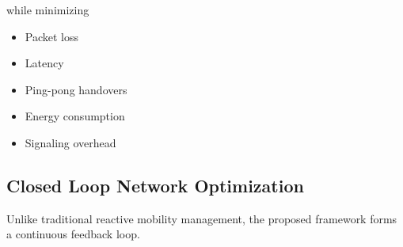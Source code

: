\documentclass[12pt,a4paper]{article}\usepackage[a4paper,margin=1in]{geometry}\usepackage{graphicx}\usepackage{longtable}\usepackage{booktabs}\usepackage{hyperref}\usepackage{enumitem}\usepackage{amsmath}\usepackage{tikz}\usepackage{pgfgantt}\usepackage{setspace}\setstretch{1.15}\usetikzlibrary{positioning,arrows.meta,shapes.geometric}
\begin{document}
	while minimizing
	
	\begin{itemize}
		
		\item Packet loss
		
		\item Latency
		
		\item Ping-pong handovers
		
		\item Energy consumption
		
		\item Signaling overhead
		
	\end{itemize}
	
	
	\subsection{Closed Loop Network Optimization}
	
	Unlike traditional reactive mobility management, the proposed framework forms a continuous feedback loop.
	
\end{document}
